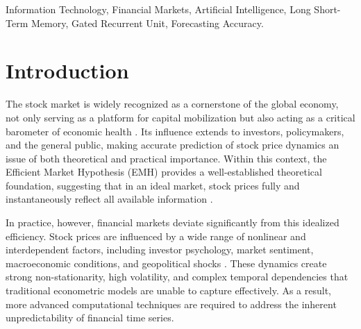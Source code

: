 \documentclass{cys}
\begin{document}
\begin{keywords} 
Information Technology,  Financial Markets, Artificial Intelligence, Long Short-Term Memory, Gated Recurrent Unit, Forecasting Accuracy.
\end{keywords} 






\section{Introduction}

The stock market is widely recognized as a cornerstone of the global economy, not only serving as a platform for capital mobilization but also acting as a critical barometer of economic health \cite{xiao2024comparative}. Its influence extends to investors, policymakers, and the general public, making accurate prediction of stock price dynamics an issue of both theoretical and practical importance. Within this context, the Efficient Market Hypothesis (EMH) provides a well-established theoretical foundation, suggesting that in an ideal market, stock prices fully and instantaneously reflect all available information \cite{genot2024predictive, ronkko2024adaptive, ehiedu2022efficient, malkiel2011efficient, lachaari2021capital}.

In practice, however, financial markets deviate significantly from this idealized efficiency. Stock prices are influenced by a wide range of nonlinear and interdependent factors, including investor psychology, market sentiment, macroeconomic conditions, and geopolitical shocks \cite{akinrinola2024predicting, satishbhai2025stock}. These dynamics create strong non-stationarity, high volatility, and complex temporal dependencies that traditional econometric models are unable to capture effectively. As a result, more advanced computational techniques are required to address the inherent unpredictability of financial time series.
\end{document}

